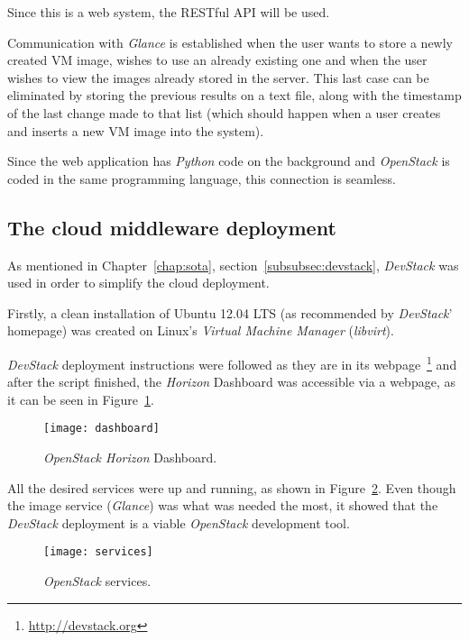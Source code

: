 Since this is a web system, the RESTful API will be used.

Communication with \textit{Glance} is established when the user wants to store a newly created VM image, wishes to use an already existing one and when the user wishes to view the images already stored in the server. This last case can be eliminated by storing the previous results on a text file, along with the timestamp of the last change made to that list (which should happen when a user creates and inserts a new VM image into the system).

Since the web application has \textit{Python} code on the background and \textit{OpenStack} is coded in the same programming language, this connection is seamless.

\subsection{The cloud middleware deployment}\label{subsec:middleware-deployment}

As mentioned in Chapter~\ref{chap:sota}, section~\ref{subsubsec:devstack}, \textit{DevStack} was used in order to simplify the cloud deployment.

Firstly, a clean installation of Ubuntu 12.04 LTS (as recommended by \textit{DevStack}' homepage) was created on Linux's \textit{Virtual Machine Manager} (\textit{libvirt}).

\textit{DevStack} deployment instructions were followed as they are in its webpage~\footnote{\url{http://devstack.org}} and after the script finished, the \textit{Horizon} Dashboard was accessible via a webpage, as it can be seen in Figure~\ref{fig:stack-dashboard}.

\begin{figure}[t]
  \begin{center}
    \leavevmode
    \texttt{[image: dashboard]}
    \caption{\textit{OpenStack Horizon} Dashboard.}
    \label{fig:stack-dashboard}
  \end{center}
\end{figure}

All the desired services were up and running, as shown in Figure~\ref{fig:services}. Even though the image service (\textit{Glance}) was what was needed the most, it showed that the \textit{DevStack} deployment is a viable \textit{OpenStack} development tool.

\begin{figure}[h]
  \begin{center}
    \leavevmode
    \texttt{[image: services]}
    \caption{\textit{OpenStack} services.}
    \label{fig:services}
  \end{center}
\end{figure}

